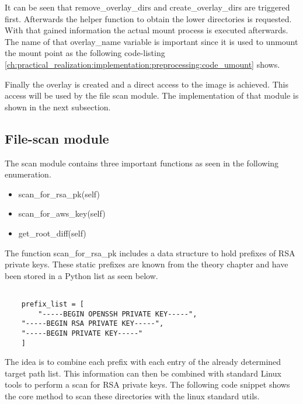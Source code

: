 
It can be seen that remove\_overlay\_dirs and create\_overlay\_dirs are triggered first. 
Afterwards the helper function to obtain the lower directories is requested.
With that gained information the actual mount process is executed afterwards. 
The name of that overlay\_name variable is important since it is used to unmount the mount point as the following code-listing \ref{ch:practical_realization:implementation:preprocessing:code_umount} shows.


Finally the overlay is created and a direct access to the image is achieved. 
This access will be used by the file scan module. The implementation of that module is shown in the next subsection.

\subsection{File-scan module}
\label{ch:practical_realization:implementation:scan}
The scan module contains three important functions as seen in the following enumeration.
\begin{itemize}
\item scan\_for\_rsa\_pk(self)
\item scan\_for\_aws\_key(self)
\item get\_root\_diff(self)
\end{itemize}
The function scan\_for\_rsa\_pk includes a data structure to hold prefixes of RSA private keys.
These static prefixes are known from the theory chapter and have been stored in a Python list as seen below.
\lstset{language=Python}          
\begin{lstlisting}[]  % Start your code-block
	
    prefix_list = [
    	"-----BEGIN OPENSSH PRIVATE KEY-----",
	"-----BEGIN RSA PRIVATE KEY-----",
	"-----BEGIN PRIVATE KEY-----"
	]
\end{lstlisting}
The idea is to combine each prefix with each entry of the already determined target path list.
This information can then be combined with standard Linux tools to perform a scan for RSA private keys.
The following code snippet shows the core method to scan these directories with the linux standard utils.

